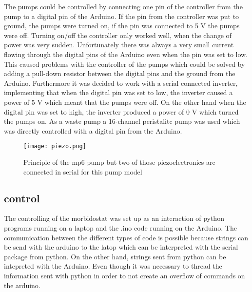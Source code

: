 The pumps could be controlled by connecting one pin of the controller from the pump to a digital pin of the Arduino. 
If the pin from the controller was put to ground, the pumps were turned on, if the pin was connected to 5 V the pumps were off. Turning on/off the controller only worked well, when the change of power was very sudden. Unfortunately there was always a very small current flowing through the digital pins of the Arduino even when the pin was set to low. 
This caused problems with the controller of the pumps which could be solved by adding a pull-down resistor between the digital pins and the ground from the Arduino. Furthermore it was decided to work with a serial connected inverter, implementing that when the digital pin was set to low, the inverter caused a power of 5 V which meant that the pumps were off. On the other hand when the digital pin was set to high, the inverter produced a power of 0 V which turned the pumps on.  
As a waste pump a 16-channel peristalitc pump was used which was directly controlled with a digital pin from the Arduino. 
\begin{figure}
	\texttt{[image: piezo.png]}
	\caption{Principle of the mp6 pump but two of those piezoelectronics are connected in serial for this pump model \cite{piezo_pumps}}
	\label{figure:piezo}
\end{figure}

\subsection{control}
The controlling of the morbidostat was set up as an interaction of python programs running on a laptop and the .ino code running on the Arduino. The communication between the different types of code is possible because strings can be send with the arduino to the latop which can be interpreted with the serial package from python. On the other hand, strings sent from python can be intepreted with the Arduino. Even though it was necessary to thread the information sent with python in order to not create an overflow of commands on the arduino. 

